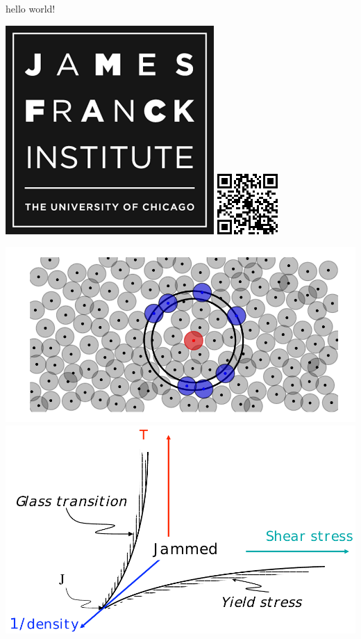 \documentclass{article}
\begin{document}
hello world! 

\includegraphics[width=1.1\linewidth]{figures/jfi_logo}
\includegraphics[width=.1\linewidth]{figures/tracking}

\includegraphics{figures/cartoon}
\includegraphics[width=\linewidth]{figures/jpd}
\end{document}
